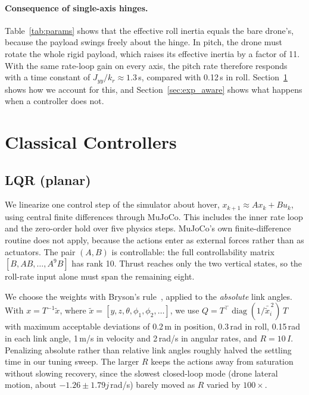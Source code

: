 \documentclass{article}
\begin{document}
\paragraph{Consequence of single-axis hinges.} Table~\ref{tab:params} shows that the
effective roll inertia equals the bare drone's, because the payload swings freely
about the hinge. In pitch, the drone must rotate the whole rigid payload, which
raises its effective inertia by a factor of 11. With the same rate-loop gain on every
axis, the pitch rate therefore responds with a time constant of
$J_{yy}/k_r \approx 1.3$\,s, compared with 0.12\,s in roll. Section~\ref{sec:control}
shows how we account for this, and Section~\ref{sec:exp_aware} shows what happens
when a controller does not.

\section{Classical Controllers}
\label{sec:control}

\subsection{LQR (planar)}
We linearize one control step of the simulator about hover, $x_{k+1} \approx A x_k +
B u_k$, using central finite differences through MuJoCo. This includes the inner rate
loop and the zero-order hold over five physics steps. MuJoCo's own finite-difference
routine does not apply, because the actions enter as external forces rather than as
actuators. The pair $(A, B)$ is controllable: the full controllability matrix
$[B, AB, \dots, A^{9}B]$ has rank 10. Thrust reaches only the two vertical states,
so the roll-rate input alone must span the remaining eight.

We choose the weights with Bryson's rule~\citep{bryson1975applied}, applied to the
\emph{absolute} link angles. With $x = T^{-1}\tilde x$, where
$\tilde x = [y, z, \theta, \phi_1, \phi_2, \dots]$, we use
$Q = T^\top \operatorname{diag}(1/\bar{\tilde x}_i^{\,2})\,T$ with maximum acceptable
deviations of 0.2\,m in position, 0.3\,rad in roll, 0.15\,rad in each link angle,
1\,m/s in velocity and 2\,rad/s in angular rates, and $R = 10\,I$. Penalizing absolute
rather than relative link angles roughly halved the settling time in our tuning sweep.
The larger $R$ keeps the actions away from saturation without slowing recovery, since
the slowest closed-loop mode (drone lateral motion, about $-1.26 \pm 1.79j$\,rad/s)
barely moved as $R$ varied by $100\times$.
\end{document}
